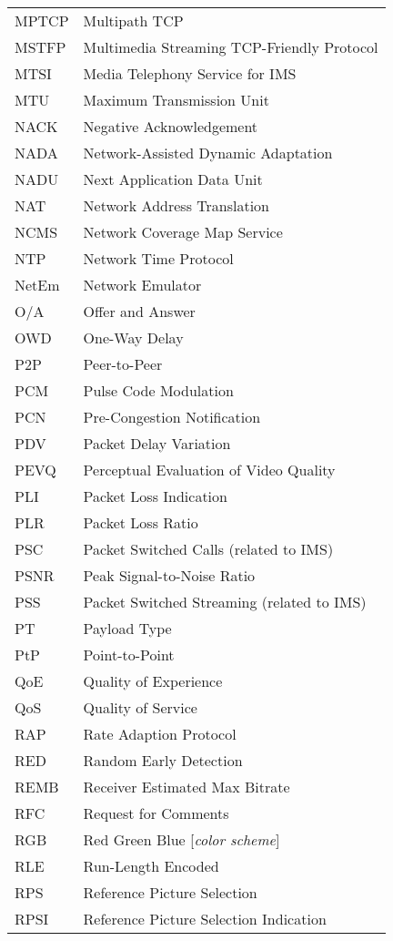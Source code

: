 \begin{longtable}{ll}
MPTCP 	& Multipath TCP \\
MSTFP 	& Multimedia Streaming TCP-Friendly Protocol \\
MTSI 	& Media Telephony Service for IMS\\
MTU  	& Maximum Transmission Unit \\
NACK 	& Negative Acknowledgement \\
NADA 	& Network-Assisted Dynamic Adaptation \\
NADU 	& Next Application Data Unit \\
NAT 	& Network Address Translation \\
NCMS 	& Network Coverage Map Service\\
NTP  	& Network Time Protocol \\
NetEm 	& Network Emulator \\
O/A  	& Offer and Answer \\
OWD 	& One-Way Delay \\
P2P 	& Peer-to-Peer \\
PCM 	& Pulse Code Modulation \\
PCN 	& Pre-Congestion Notification \\
PDV 	& Packet Delay Variation \\
PEVQ 	& Perceptual Evaluation of Video Quality \\
PLI 	& Packet Loss Indication \\
PLR 	& Packet Loss Ratio \\
PSC 	& Packet Switched Calls (related to IMS)\\
PSNR	& Peak Signal-to-Noise Ratio \\
PSS 	& Packet Switched Streaming (related to IMS)\\
PT  	& Payload Type \\
PtP 	& Point-to-Point \\
QoE 	& Quality of Experience \\
QoS 	& Quality of Service \\
RAP 	& Rate Adaption Protocol \\
RED 	& Random Early Detection \\
REMB 	& Receiver Estimated Max Bitrate \\
RFC 	& Request for Comments \\
RGB 	& Red Green Blue [\textit{color scheme}] \\
RLE 	& Run-Length Encoded \\
RPS 	& Reference Picture Selection \\
RPSI 	& Reference Picture Selection Indication \\

\end{longtable}

